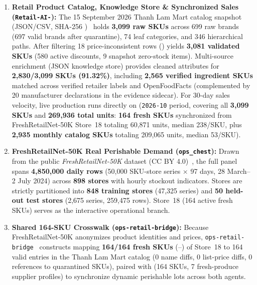 \begin{enumerate}
    \item \textbf{Retail Product Catalog, Knowledge Store \& Synchronized Sales (\texttt{Retail-AI-}):} The 15 September 2026 Thanh Lam Mart catalog snapshot (JSON/CSV, SHA-256 )~\cite{thanh_lam_catalog} holds \textbf{3,099 raw SKUs} across 699 raw brands (697 valid brands after quarantine), 74 leaf categories, and 346 hierarchical paths. After filtering 18 price-inconsistent rows () yields \textbf{3,081 validated SKUs} (580 active discounts, 9 snapshot zero-stock items). Multi-source enrichment (JSON knowledge store) provides cleaned attributes for \textbf{2,830/3,099 SKUs (91.32\%)}, including \textbf{2,565 verified ingredient SKUs} matched across verified retailer labels and OpenFoodFacts (complemented by 20 manufacturer declarations in the evidence sidecar). For 30-day sales velocity, live production runs directly on  (\texttt{2026-10} period, covering all \textbf{3,099 SKUs} and \textbf{269,936 total units}: \textbf{164 fresh SKUs} synchronized from FreshRetailNet-50K Store~18 totaling 60,871 units, median 238/SKU, plus \textbf{2,935 monthly catalog SKUs} totaling 209,065 units, median 53/SKU).
    \item \textbf{FreshRetailNet-50K Real Perishable Demand (\texttt{ops\_chest}):} Drawn from the public \emph{FreshRetailNet-50K} dataset (CC BY 4.0)~\cite{freshretailnet50k}, the full panel spans \textbf{4,850,000 daily rows} (50,000 SKU-store series $\times$ 97 days, 28 March--2 July 2024) across \textbf{898 stores} with hourly stockout indicators. Stores are strictly partitioned into \textbf{848 training stores} (47,325 series) and \textbf{50 held-out test stores} (2,675 series, 259,475 rows). Store~18 (164 active fresh SKUs) serves as the interactive operational branch.
    \item \textbf{Shared 164-SKU Crosswalk (\texttt{ops-retail-bridge}):} Because FreshRetailNet-50K anonymizes product identities and prices, \texttt{ops-retail-bridge}~\cite{ops_retail_bridge_repo} constructs  mapping \textbf{164/164 fresh SKUs} (--) of Store~18 to 164 valid  entries in the Thanh Lam Mart catalog (0 name diffs, 0 list-price diffs, 0 references to quarantined SKUs), paired with  (164 SKUs, 7 fresh-produce supplier profiles) to synchronize dynamic perishable lots across both agents.
\end{enumerate}

